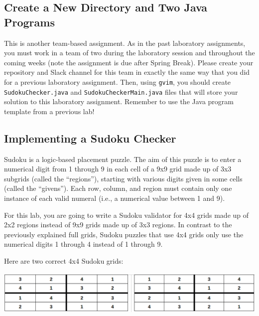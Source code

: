 \vspace{-0.1in}
\subsection*{Create a New Directory and Two Java Programs}
\vspace{-0.05in}


This is another team-based assignment. As in the past laboratory assignments, you must work in a team of two during the
laboratory session and throughout the coming weeks (note the assignment is due after Spring Break). Please create your
repository and Slack channel for this team in exactly the same way that you did for a previous laboratory assignment.
Then, using {\tt gvim}, you should create {\tt SudokuChecker.java} and {\tt SudokuCheckerMain.java} files that will
store your solution to this laboratory assignment. Remember to use the Java program template from a previous lab!

\vspace{-0.1in}
\subsection*{Implementing a Sudoku Checker}
\vspace{-0.05in}

Sudoku is a logic-based placement puzzle. The aim of this puzzle is to enter a numerical digit from 1 through 9 in each
cell of a 9x9 grid made up of 3x3 subgrids (called the ``regions''), starting with various digits given in some cells
(called the ``givens''). Each row, column, and region must contain only one instance of each valid numeral (i.e., a
numerical value between 1 and 9).

\noindent For this lab, you are going to write a Sudoku validator for 4x4 grids made up of 2x2 regions instead of 9x9
grids made up of 3x3 regions.  In contrast to the previously explained full grids, Sudoku puzzles that use 4x4 grids
only use the numerical digits 1 through 4 instead of 1 through 9.

\noindent Here are two correct 4x4 Sudoku grids:

\vspace*{.01in}
\includegraphics[scale=0.3]{grids}

